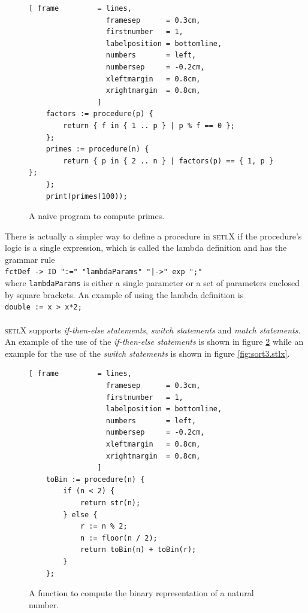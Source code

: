 \documentclass[11pt]{report}
\begin{document}
\begin{figure}[!ht]
\centering
\begin{Verbatim}[ frame         = lines, 
                  framesep      = 0.3cm, 
                  firstnumber   = 1,
                  labelposition = bottomline,
                  numbers       = left,
                  numbersep     = -0.2cm,
                  xleftmargin   = 0.8cm,
                  xrightmargin  = 0.8cm,
                ]
    factors := procedure(p) {
        return { f in { 1 .. p } | p % f == 0 };
    };
    primes := procedure(n) {
        return { p in { 2 .. n } | factors(p) == { 1, p } };
    };
    print(primes(100));
\end{Verbatim}
\vspace*{-0.3cm}
\caption{A naive program to compute primes.}
\label{fig:primes-slim.stlx}
\end{figure}

There is actually a simpler way to define a procedure in \textsc{setlX} if the procedure's logic is a single expression, which is called the lambda definition and has the grammar rule
\\[0.2cm]
\hspace*{1.3cm}
\texttt{fctDef -> ID ":=" "lambdaParams" "|->" exp ";"}
\\[0.2cm]
where \texttt{lambdaParams} is either a single parameter or a set of parameters enclosed by square brackets. An example of using the lambda definition is
\\[0.2cm]
\hspace*{1.3cm}
\texttt{double := x \-> x*2;}
\\[0.2cm]
\\

\textsc{setlX} supports \textsl{if-then-else statements}, \textsl{switch statements} and \textsl{match statements}. An example of the use of the \textsl{if-then-else statements} is shown in figure \ref{fig:toBin.stlx} while an example for the use of the \textsl{switch statements} is shown in figure \ref{fig:sort3.stlx}.

\begin{figure}[!ht]
\centering
\begin{Verbatim}[ frame         = lines, 
                  framesep      = 0.3cm, 
                  firstnumber   = 1,
                  labelposition = bottomline,
                  numbers       = left,
                  numbersep     = -0.2cm,
                  xleftmargin   = 0.8cm,
                  xrightmargin  = 0.8cm,
                ]
    toBin := procedure(n) {
        if (n < 2) {
            return str(n);
        } else {
            r := n % 2;
            n := floor(n / 2);
            return toBin(n) + toBin(r);
        }
    };
\end{Verbatim}
\vspace*{-0.3cm}
\caption{A function to compute the binary representation of a natural number.}
\label{fig:toBin.stlx}
\end{figure}
\end{document}
